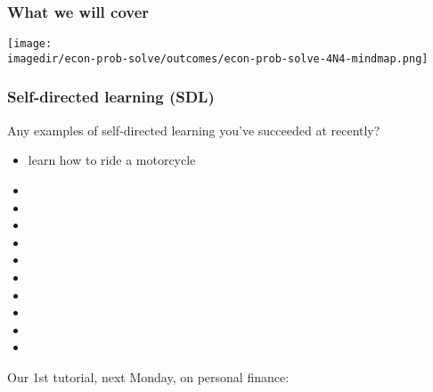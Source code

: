 \begin{frame}\frametitle{What we will cover}
	\begin{center}
		\texttt{[image: \\imagedir/econ-prob-solve/outcomes/econ-prob-solve-4N4-mindmap.png]}
	\end{center}
\end{frame}

\begin{frame}\frametitle{Self-directed learning (SDL)}
	Any examples of self-directed learning you've succeeded at recently?
	\begin{itemize}
		\item	learn how to ride a motorcycle
		\item	\pause\iftoggle{instructor}{how to fix drywall}{}
		\item	\iftoggle{instructor}{change your car's oil or battery}{}		
		\item	\iftoggle{instructor}{fix plumbing in your apartment/house}{}
		\item	\iftoggle{instructor}{cook an ethnic food dish to impress your date/partner/family}{}
		\item	\iftoggle{instructor}{something learned during your co-op work term?}{}
		\item	\iftoggle{instructor}{going through process of buying a car or a house}{}
		\item	\iftoggle{instructor}{plant, grow and maintain your own vegetables}{}
		\item	\iftoggle{instructor}{learn a new language for travel/pleasure}{}
		\item	\iftoggle{instructor}{start your own company and run it: what is required?}{}
		\item	\iftoggle{instructor}{figure out if I'm better off buying a new car or a used car?}{}
	\end{itemize}
	\vspace{12pt}
	\pause
	Our 1st tutorial, next Monday, on personal finance: {\small \color{myOrange}{completely SDL}}
\end{frame}

